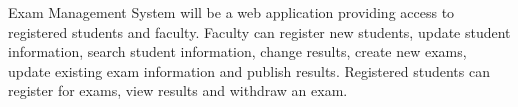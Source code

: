 Exam Management System will be a web application providing access to registered students and faculty. 
Faculty can register new students, update student information, search student information, change results, create new exams, update existing exam information and publish results. Registered students can register for exams, view results and withdraw an exam.
